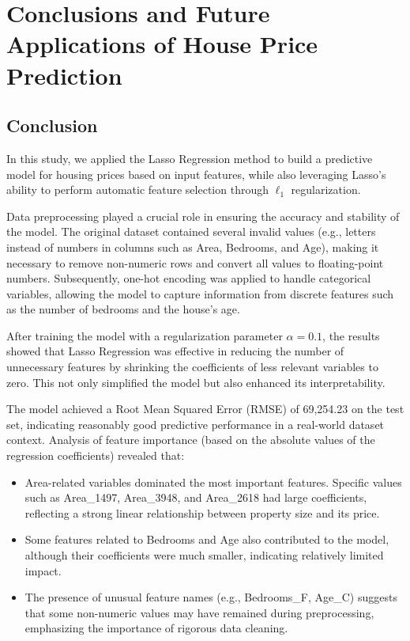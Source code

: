 \documentclass[12pt, a4paper]{report}
\begin{document}
\newpage


\chapter{Conclusions and Future Applications of House
Price Prediction}
\section{Conclusion}

In this study, we applied the Lasso Regression method to build a predictive model for housing prices based on input features, while also leveraging Lasso’s ability to perform automatic feature selection through $\ell_1$ regularization.

Data preprocessing played a crucial role in ensuring the accuracy and stability of the model. The original dataset contained several invalid values (e.g., letters instead of numbers in columns such as Area, Bedrooms, and Age), making it necessary to remove non-numeric rows and convert all values to floating-point numbers. Subsequently, one-hot encoding was applied to handle categorical variables, allowing the model to capture information from discrete features such as the number of bedrooms and the house’s age.

After training the model with a regularization parameter $\alpha = 0.1$, the results showed that Lasso Regression was effective in reducing the number of unnecessary features by shrinking the coefficients of less relevant variables to zero. This not only simplified the model but also enhanced its interpretability.

The model achieved a Root Mean Squared Error (RMSE) of 69,254.23 on the test set, indicating reasonably good predictive performance in a real-world dataset context. Analysis of feature importance (based on the absolute values of the regression coefficients) revealed that:

\begin{itemize}
    \item Area-related variables dominated the most important features. Specific values such as Area\_1497, Area\_3948, and Area\_2618 had large coefficients, reflecting a strong linear relationship between property size and its price.
    \item Some features related to Bedrooms and Age also contributed to the model, although their coefficients were much smaller, indicating relatively limited impact.
    \item The presence of unusual feature names (e.g., Bedrooms\_F, Age\_C) suggests that some non-numeric values may have remained during preprocessing, emphasizing the importance of rigorous data cleaning.
\end{itemize}
\end{document}
